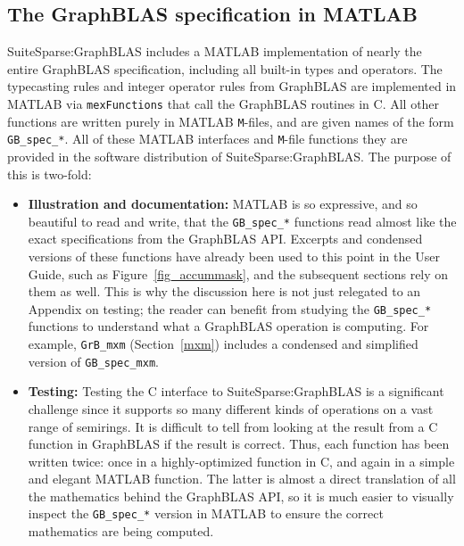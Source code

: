 \documentclass[12pt]{article}
\begin{document}
\vspace{0.2in}




\newpage
\subsection{The GraphBLAS specification in {MATLAB}} %
\label{spec}

SuiteSparse:GraphBLAS includes a MATLAB implementation of nearly the entire
GraphBLAS specification, including all built-in types and operators.  The
typecasting rules and integer operator rules from GraphBLAS are implemented in
MATLAB via \verb'mexFunctions' that call the GraphBLAS routines in C.  All
other functions are written purely in MATLAB \verb'M'-files, and are given
names of the form \verb'GB_spec_*'.  All of these MATLAB interfaces and
\verb'M'-file functions they are provided in the software distribution of
SuiteSparse:GraphBLAS.  The purpose of this is two-fold:

\begin{itemize}

\item {\bf Illustration and documentation:}  MATLAB is so expressive, and so
    beautiful to read and write, that the \verb'GB_spec_*' functions read
    almost like the exact specifications from the GraphBLAS API.
    Excerpts and condensed versions of these functions have
    already been used to this point in the User Guide, such as
    Figure~\ref{fig_accummask}, and the subsequent sections rely on them as
    well.  This is why the discussion here is not just relegated to an Appendix
    on testing; the reader can benefit from studying the \verb'GB_spec_*'
    functions to understand what a GraphBLAS operation is computing.  For
    example, \verb'GrB_mxm' (Section~\ref{mxm}) includes a condensed and
    simplified version of \verb'GB_spec_mxm'.

\item {\bf Testing:} Testing the C interface to SuiteSparse:GraphBLAS is a
    significant challenge since it supports so many different kinds of
    operations on a vast range of semirings.  It is difficult to tell from
    looking at the result from a C function in GraphBLAS if the result is
    correct.  Thus, each function has been written twice: once in a
    highly-optimized function in C, and again in a simple and elegant MATLAB
    function.  The latter is almost a direct translation of all the mathematics
    behind the GraphBLAS API, so it is much easier to visually
    inspect the \verb'GB_spec_*' version in MATLAB to ensure the correct
    mathematics are being computed.

\end{itemize}
\end{document}
